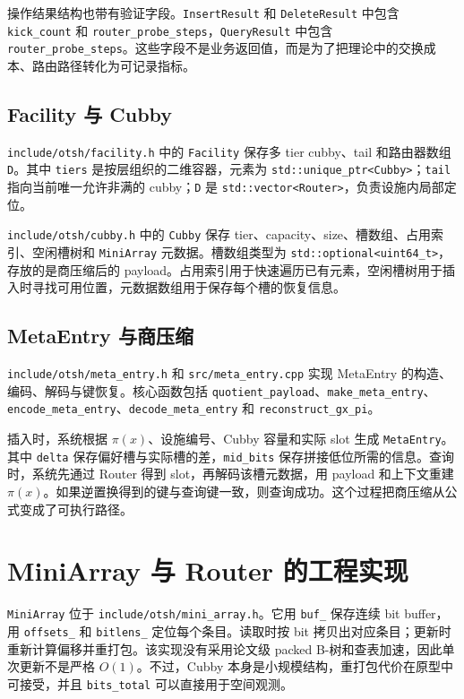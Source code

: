 操作结果结构也带有验证字段。\texttt{InsertResult} 和 \texttt{DeleteResult} 中包含 \texttt{kick\_count} 和 \texttt{router\_probe\_steps}，\texttt{QueryResult} 中包含 \texttt{router\_probe\_steps}。这些字段不是业务返回值，而是为了把理论中的交换成本、路由路径转化为可记录指标。

\subsection{Facility 与 Cubby}
\texttt{include/otsh/facility.h} 中的 \texttt{Facility} 保存多 tier cubby、tail 和路由器数组 \texttt{D}。其中 \texttt{tiers} 是按层组织的二维容器，元素为 \texttt{std::unique\_ptr<Cubby>}；\texttt{tail} 指向当前唯一允许非满的 cubby；\texttt{D} 是 \texttt{std::vector<Router>}，负责设施内局部定位。

\texttt{include/otsh/cubby.h} 中的 \texttt{Cubby} 保存 tier、capacity、size、槽数组、占用索引、空闲槽树和 \texttt{MiniArray} 元数据。槽数组类型为 \texttt{std::optional<uint64\_t>}，存放的是商压缩后的 payload。占用索引用于快速遍历已有元素，空闲槽树用于插入时寻找可用位置，元数据数组用于保存每个槽的恢复信息。

\subsection{MetaEntry 与商压缩}
\texttt{include/otsh/meta\_entry.h} 和 \texttt{src/meta\_entry.cpp} 实现 MetaEntry 的构造、编码、解码与键恢复。核心函数包括 \texttt{quotient\_payload}、\texttt{make\_meta\_entry}、\texttt{encode\_meta\_entry}、\texttt{decode\_meta\_entry} 和 \texttt{reconstruct\_gx\_pi}。

插入时，系统根据 \(\pi(x)\)、设施编号、Cubby 容量和实际 slot 生成 \texttt{MetaEntry}。其中 \texttt{delta} 保存偏好槽与实际槽的差，\texttt{mid\_bits} 保存拼接低位所需的信息。查询时，系统先通过 Router 得到 slot，再解码该槽元数据，用 payload 和上下文重建 \(\pi(x)\)。如果逆置换得到的键与查询键一致，则查询成功。这个过程把商压缩从公式变成了可执行路径。

\section{MiniArray 与 Router 的工程实现}
\texttt{MiniArray} 位于 \texttt{include/otsh/mini\_array.h}。它用 \texttt{buf\_} 保存连续 bit buffer，用 \texttt{offsets\_} 和 \texttt{bitlens\_} 定位每个条目。读取时按 bit 拷贝出对应条目；更新时重新计算偏移并重打包。该实现没有采用论文级 packed B-树和查表加速，因此单次更新不是严格 \(O(1)\)。不过，Cubby 本身是小规模结构，重打包代价在原型中可接受，并且 \texttt{bits\_total} 可以直接用于空间观测。

